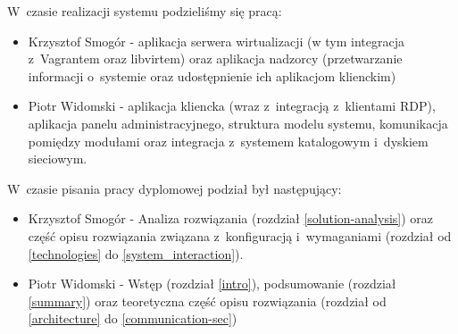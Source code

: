 \documentclass[../wstep.tex]{subfiles}
\begin{document}
W~czasie realizacji systemu podzieliśmy się pracą:
\begin{itemize}
    \item Krzysztof Smogór - aplikacja serwera wirtualizacji (w tym integracja z~Vagrantem oraz libvirtem) oraz aplikacja nadzorcy (przetwarzanie informacji o~systemie oraz udostępnienie ich aplikacjom klienckim)
    \item Piotr Widomski - aplikacja kliencka (wraz z~integracją z~klientami RDP), aplikacja panelu administracyjnego, struktura modelu systemu, komunikacja pomiędzy modułami oraz integracja z~systemem katalogowym i~dyskiem sieciowym.
\end{itemize}

W~czasie pisania pracy dyplomowej podział był następujący:
\begin{itemize}
    \item Krzysztof Smogór - Analiza rozwiązania (rozdział \ref{solution-analysis}) oraz część opisu rozwiązania związana z~konfiguracją i~wymaganiami (rozdział od \ref{technologies} do \ref{system_interaction}).
    \item Piotr Widomski - Wstęp (rozdział \ref{intro}), podsumowanie (rozdział \ref{summary}) oraz teoretyczna część opisu rozwiązania (rozdział od \ref{architecture} do \ref{communication-sec})
\end{itemize}
\end{document}
